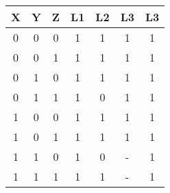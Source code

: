 \begin{tabular}{|c|c|c|c|c|c|c|}
        \hline X & Y & Z & L1 & L2 & L3 & L3 \\
        \hline 0 & 0 & 0 & 1 & 1 & 1 & 1 \\
        \hline 0 & 0 & 1 & 1 & 1 & 1 & 1 \\
        \hline 0 & 1 & 0 & 1 & 1 & 1 & 1 \\
        \hline 0 & 1 & 1 & 1 & 0 & 1 & 1 \\
	\hline 1 & 0 & 0 & 1 & 1 & 1 & 1 \\
	\hline 1 & 0 & 1 & 1 & 1 & 1 & 1 \\
	\hline 1 & 1 & 0 & 1 & 0 & - & 1 \\
	\hline 1 & 1 & 1 & 1 & 1 & - & 1 \\
	\hline
        \end{tabular}

